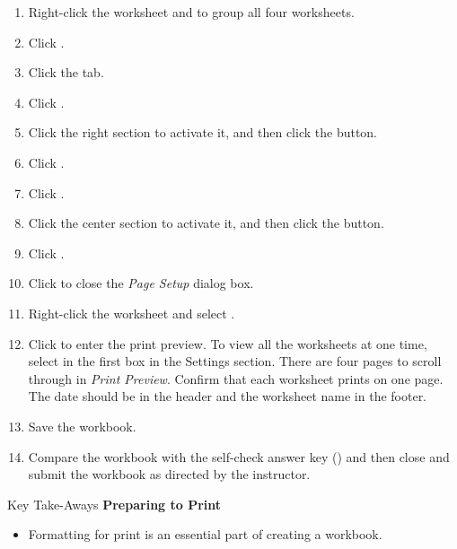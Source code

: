 \begin{enumbox}
\begin{enumerate}
		\item Right-click the  worksheet and  to group all four worksheets. 
		\item Click .
		\item Click the  tab.
		\item Click .
		\item Click the right section to activate it, and then click the  button.
		\item Click .
		\item Click .
		\item Click the center section to activate it, and then click the  button.
		\item Click .
		\item Click  to close the \textit{Page Setup} dialog box.
		\item Right-click the  worksheet and select .
		\item Click  to enter the print preview. To view all the worksheets at one time, select  in the first box in the Settings section. There are four pages to scroll through in \textit{Print Preview}. Confirm that each worksheet prints on one page. The date should be in the header and the worksheet name in the footer.
		\item Save the  workbook.
	
	\item Compare the workbook with the self-check answer key () and then close and submit the  workbook as directed by the instructor.
		
	\end{enumerate}
\end{enumbox}


\begin{center}
	\begin{tkwbox}{Key Take-Aways}
		\textbf{Preparing to Print}
		\\
		\begin{itemize}
			\setlength{\itemsep}{0pt}
			\setlength{\parskip}{0pt}
			\setlength{\parsep}{0pt}
			
			\item Formatting for print is an essential part of creating a workbook.
			
		\end{itemize}
	\end{tkwbox}
\end{center}

